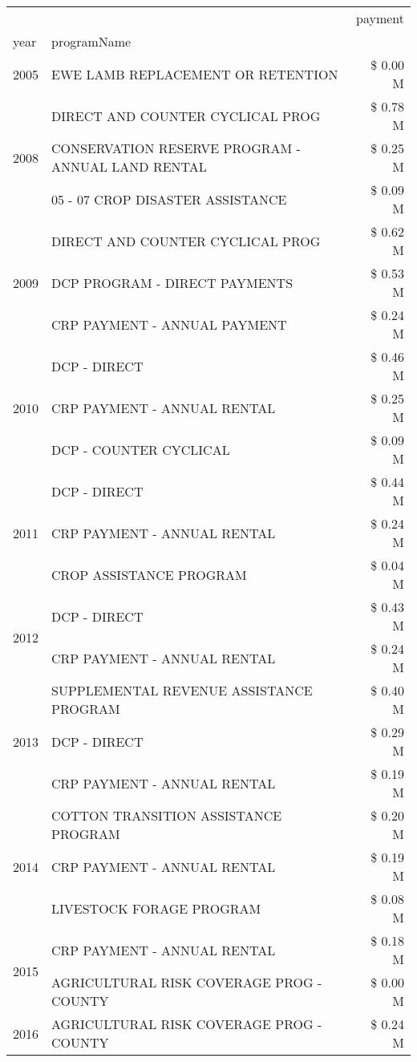 \begin{tabular}{llr}
\toprule
 &  & payment \\
year & programName &  \\
\midrule
2005 & EWE LAMB REPLACEMENT OR RETENTION & \$ 0.00 M \\
\cline{1-3}
\multirow[t]{3}{*}{2008} & DIRECT AND COUNTER CYCLICAL PROG & \$ 0.78 M \\
 & CONSERVATION RESERVE PROGRAM - ANNUAL LAND RENTAL & \$ 0.25 M \\
 & 05 - 07 CROP DISASTER ASSISTANCE & \$ 0.09 M \\
\cline{1-3}
\multirow[t]{3}{*}{2009} & DIRECT AND COUNTER CYCLICAL PROG & \$ 0.62 M \\
 & DCP PROGRAM - DIRECT PAYMENTS & \$ 0.53 M \\
 & CRP PAYMENT - ANNUAL PAYMENT & \$ 0.24 M \\
\cline{1-3}
\multirow[t]{3}{*}{2010} & DCP - DIRECT & \$ 0.46 M \\
 & CRP PAYMENT - ANNUAL RENTAL & \$ 0.25 M \\
 & DCP - COUNTER CYCLICAL & \$ 0.09 M \\
\cline{1-3}
\multirow[t]{3}{*}{2011} & DCP - DIRECT & \$ 0.44 M \\
 & CRP PAYMENT - ANNUAL RENTAL & \$ 0.24 M \\
 & CROP ASSISTANCE PROGRAM & \$ 0.04 M \\
\cline{1-3}
\multirow[t]{2}{*}{2012} & DCP - DIRECT & \$ 0.43 M \\
 & CRP PAYMENT - ANNUAL RENTAL & \$ 0.24 M \\
\cline{1-3}
\multirow[t]{3}{*}{2013} & SUPPLEMENTAL REVENUE ASSISTANCE PROGRAM & \$ 0.40 M \\
 & DCP - DIRECT & \$ 0.29 M \\
 & CRP PAYMENT - ANNUAL RENTAL & \$ 0.19 M \\
\cline{1-3}
\multirow[t]{3}{*}{2014} & COTTON TRANSITION ASSISTANCE PROGRAM & \$ 0.20 M \\
 & CRP PAYMENT - ANNUAL RENTAL & \$ 0.19 M \\
 & LIVESTOCK FORAGE PROGRAM & \$ 0.08 M \\
\cline{1-3}
\multirow[t]{2}{*}{2015} & CRP PAYMENT - ANNUAL RENTAL & \$ 0.18 M \\
 & AGRICULTURAL RISK COVERAGE PROG - COUNTY & \$ 0.00 M \\
\cline{1-3}
\multirow[t]{3}{*}{2016} & AGRICULTURAL RISK COVERAGE PROG - COUNTY & \$ 0.24 M \\

\end{tabular}
